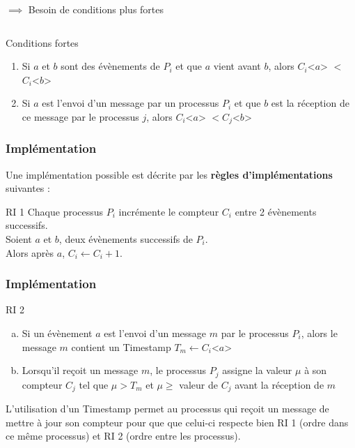 \documentclass[compress]{beamer}
\begin{document}
\begin{frame}
\begin{columns}
\begin{column}{0.65 \textwidth}
$\implies$ Besoin de conditions plus fortes
	\end{column}
	\end{columns}
\begin{block}{Conditions fortes}
\begin{enumerate}
\item Si $a$ et $b$ sont des évènements de $P_i$ et que $a$ vient avant $b$, alors $C_i$<$a$> $<$ $C_i$<$b$>
\item Si $a$ est l'envoi d'un message par un processus $P_i$ et que $b$ est la réception de ce message par le processus $j$, alors $C_i$<$a$> $< C_j$<$b$>
\end{enumerate}
\end{block}
\end{frame}



\begin{frame}
\frametitle{Implémentation}
Une implémentation possible est décrite par les  
\textbf{\color{cyan}règles d'implémentations }suivantes : \bigskip
\begin{block}{RI 1} 
Chaque processus $P_i$ incrémente le compteur $C_i$ entre 2 évènements successifs.\\
Soient $a$ et $b$, deux évènements successifs de $P_i$. \\
Alors après $a$, $C_i \leftarrow C_i + 1$.
\end{block}
\end{frame}

\begin{frame}
	\frametitle{Implémentation}
	\begin{block}{RI 2}
	\begin{enumerate}[(a)]
		\item Si un évènement $a$ est l'envoi d'un message $m$ par le processus $P_i$, alors le message $m$ contient un Timestamp $T_m \leftarrow C_i$<$a$>
		\item Lorsqu'il reçoit un message $m$, le processus $P_j$ assigne la valeur $\mu$ à son compteur $C_j$ tel que $\mu > T_m$ et $\mu \geq$ valeur de $C_j$ avant la réception de $m$
	\end{enumerate}
	\end{block}
	\bigskip
	L'utilisation d'un Timestamp permet au processus qui reçoit un message de mettre à jour son compteur pour que que celui-ci respecte bien RI 1 (ordre dans ce même processus) et RI 2 (ordre entre les processus).
\end{frame}
\end{document}
